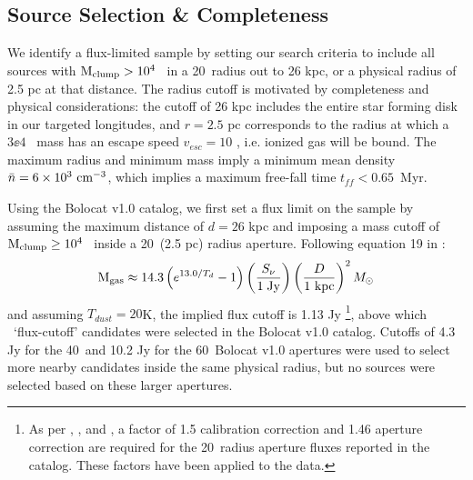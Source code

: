 \subsection{Source Selection \& Completeness}
\label{sec:selection}
We identify a flux-limited sample by setting our search criteria to
include all sources with ${\rm M}_{\rm clump}>10^4$ \msun\ in a 20\arcsec\ radius out to 26 
kpc, or a physical radius of 2.5 pc at that distance.  The radius cutoff is
motivated by completeness and physical considerations: the cutoff of 26 kpc includes
the entire star forming disk in our targeted longitudes, and $r=2.5$ pc corresponds
to the radius at which a $3\ee{4}$ \msun\ mass has an escape speed $v_{esc}=10$ \kms, i.e.
ionized gas will be bound. 
The maximum radius and minimum mass imply a minimum mean density
$\bar{n}=6\times10^3~\textrm{cm}^{-3}$, which implies a maximum free-fall time $t_{ff}<0.65$~Myr.

Using the Bolocat v1.0 catalog, we first set a flux limit on the sample by assuming
the maximum distance of $d=26$ kpc and imposing a mass cutoff of ${\rm M}_{\rm clump}\geq10^4$ \msun\ 
inside a 20\arcsec\ (2.5 pc) radius aperture.  Following equation 19 in
\citet{Aguirre2011}:
\begin{equation} 
    {\rm M}_{\rm gas}\approx 14.3 \left( e^{13.0/T_d}-1 \right)
        \left({S_\nu\over 1\; {\rm Jy}} \right)
        \left(\frac{D}{{\rm 1~kpc}}\right)^{2} M_{\odot} 
\end{equation}   
and assuming $T_{dust}=20$K, the implied flux cutoff is 1.13 Jy \footnote{As
per \citet{Rosolowsky2010}, \citet{Aguirre2011}, and \citet{Ginsburg2012}, a
factor of 1.5 calibration correction and 1.46 aperture correction are required
for the 20\arcsec\ radius aperture fluxes reported in the catalog.  These
factors have been applied to the data. }, above which \nsample\ `flux-cutoff'
candidates were selected in the Bolocat v1.0 catalog.  Cutoffs of 4.3 Jy for
the 40\arcsec\ and 10.2 Jy for the 60\arcsec\ Bolocat v1.0 apertures were used
to select more nearby candidates inside the same physical radius, but no
sources were selected based on these larger apertures.



